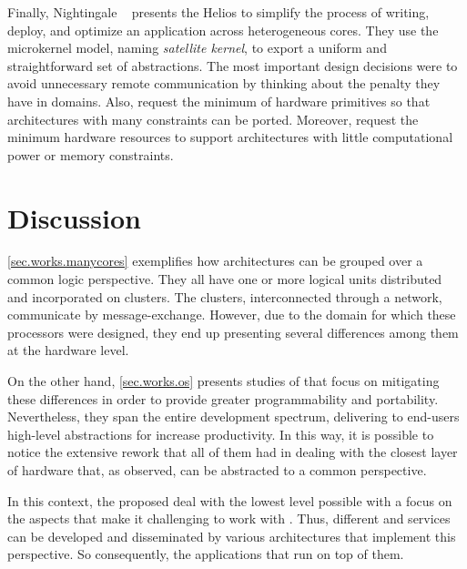 	Finally, Nightingale \etal~\cite{nightingale2009} presents the Helios \os to
	simplify the process of writing, deploy, and optimize an application across
	heterogeneous cores.
	They use the microkernel model, naming \textit{satellite kernel}, to export
	a uniform and straightforward set of \os abstractions.
	The most important design decisions were to avoid unnecessary remote communication
	by thinking about the penalty they have in \numa domains.
	Also, request the minimum of hardware primitives so that architectures with many
	constraints can be ported.
	Moreover, request the minimum hardware resources to support architectures with little
	computational power or memory constraints.

\section{Discussion}

	\autoref{sec.works.manycores} exemplifies how \manycore architectures can be
	grouped over a common logic perspective.
	They all have one or more logical units distributed and incorporated on clusters.
	The clusters, interconnected through a network, communicate by message-exchange.
	However, due to the domain for which these processors were designed, they end up
	presenting several differences among them at the hardware level.

	On the other hand, \autoref{sec.works.os} presents studies of \oss that focus on
	mitigating these differences in order to provide greater programmability and portability.
	Nevertheless, they span the entire development spectrum, delivering to end-users
	high-level abstractions for increase productivity.
	In this way, it is possible to notice the extensive rework that all of them had in
	dealing with the closest layer of hardware that, as observed, can be abstracted to
	a common perspective.

	In this context, the proposed \hal deal with the lowest level possible with a focus
	on the aspects that make it challenging to work with \manycores.
	Thus, different \oss and services can be developed and disseminated by various
	architectures that implement this perspective.
	So consequently, the applications that run on top of them.